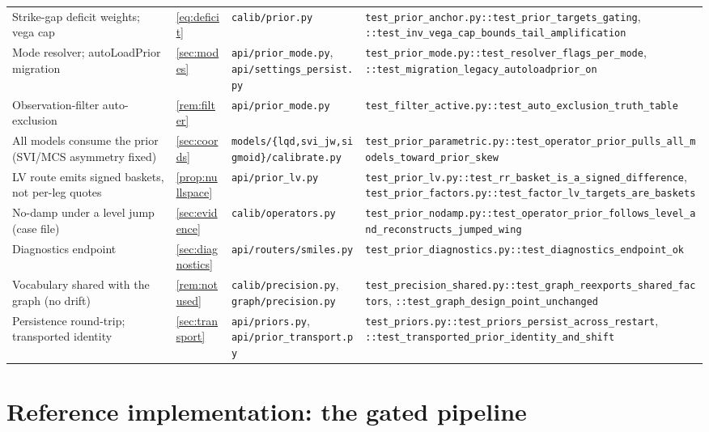 \documentclass[11pt]{article}
\begin{document}
\begin{longtable}{@{}p{}p{}p{}p{}@{}}
Strike-gap deficit weights; vega cap &
\eqref{eq:deficit} &
\nolinkurl{calib/prior.py} &
\nolinkurl{test_prior_anchor.py::test_prior_targets_gating},
\nolinkurl{::test_inv_vega_cap_bounds_tail_amplification}\\
Mode resolver; autoLoadPrior migration &
\cref{sec:modes} &
\nolinkurl{api/prior_mode.py}, \nolinkurl{api/settings_persist.py} &
\nolinkurl{test_prior_mode.py::test_resolver_flags_per_mode},
\nolinkurl{::test_migration_legacy_autoloadprior_on}\\
Observation-filter auto-exclusion &
\cref{rem:filter} &
\nolinkurl{api/prior_mode.py} &
\nolinkurl{test_filter_active.py::test_auto_exclusion_truth_table}\\
All models consume the prior (SVI/MCS asymmetry fixed) &
\cref{sec:coords} &
\nolinkurl{models/{lqd,svi_jw,sigmoid}/calibrate.py} &
\nolinkurl{test_prior_parametric.py::test_operator_prior_pulls_all_models_toward_prior_skew}\\
LV route emits signed baskets, not per-leg quotes &
\cref{prop:nullspace} &
\nolinkurl{api/prior_lv.py} &
\nolinkurl{test_prior_lv.py::test_rr_basket_is_a_signed_difference},
\nolinkurl{test_prior_factors.py::test_factor_lv_targets_are_baskets}\\
No-damp under a level jump (case file) &
\cref{sec:evidence} &
\nolinkurl{calib/operators.py} &
\nolinkurl{test_prior_nodamp.py::test_operator_prior_follows_level_and_reconstructs_jumped_wing}\\
Diagnostics endpoint &
\cref{sec:diagnostics} &
\nolinkurl{api/routers/smiles.py} &
\nolinkurl{test_prior_diagnostics.py::test_diagnostics_endpoint_ok}\\
Vocabulary shared with the graph (no drift) &
\cref{rem:notused} &
\nolinkurl{calib/precision.py}, \nolinkurl{graph/precision.py} &
\nolinkurl{test_precision_shared.py::test_graph_reexports_shared_factors},
\nolinkurl{::test_graph_design_point_unchanged}\\
Persistence round-trip; transported identity &
\cref{sec:transport} &
\nolinkurl{api/priors.py}, \nolinkurl{api/prior_transport.py} &
\nolinkurl{test_priors.py::test_priors_persist_across_restart},
\nolinkurl{::test_transported_prior_identity_and_shift}\\
\bottomrule
\end{longtable}
\endgroup

\section{Reference implementation: the gated pipeline}
\label{app:ref}
\end{document}
